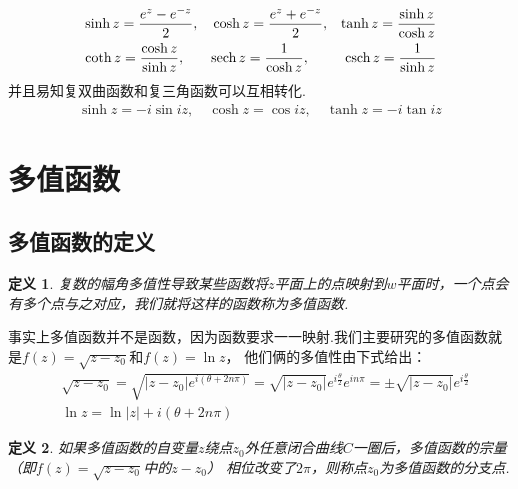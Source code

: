 \documentclass[12pt, a4paper]{ctexbook}
\newtheorem{definition}{定义}[chapter] %
\begin{document}
\begin{enumerate}
                        \begin{align*}
                            & \sinh{z} = \frac{e^z - e^{-z}}{2},& &\cosh{z} = \frac{e^z + e^{-z}}{2}, & \tanh{z} = \frac{\sinh{z}}{\cosh{z}}&\\
                            & \coth{z} = \frac{\cosh{z}}{\sinh{z}},& &\textnormal{sech}\,z = \frac{1}{\cosh{z}}, & \textnormal{csch}\,z = \frac{1}{\sinh{z}}&
                        \end{align*}
                        并且易知复双曲函数和复三角函数可以互相转化.
                        \begin{align*}
                            \sinh{z} = -i\sin{iz}, \quad \cosh{z} = \cos{iz}, \quad \tanh{z} = -i\tan{iz}
                        \end{align*}
                \end{enumerate}


        \section{多值函数}

            \subsection{多值函数的定义}
                \allowdisplaybreaks
                \begin{definition}
                    \label{def:multi_value_function}
                    复数的幅角多值性导致某些函数将$z$平面上的点映射到$w$平面时，一个点会有多个点与之对应，我们就将这样的函数称为多值函数.
                \end{definition}

                事实上多值函数并不是函数，因为函数要求一一映射.我们主要研究的多值函数就是$f(z) = \sqrt{z - z_0}$和$f(z) = \ln{z}$，
                他们俩的多值性由下式给出：
                \begin{align}
                    \label{eq:multi_value_function}
                    &\sqrt{z - z_0} = \sqrt{|z - z_0|e^{i(\theta + 2n\pi)}} = \sqrt{|z - z_0|}e^{i\frac{\theta}{2}}e^{in\pi} = \pm \sqrt{|z - z_0|}e^{i\frac{\theta}{2}}\\
                    &\ln{z} = \ln{|z|} + i(\theta + 2n\pi)
                \end{align}

                \begin{definition}
                    \label{def:branch_point}
                    如果多值函数的自变量$z$绕点$z_0$外任意闭合曲线$C$一圈后，多值函数的宗量（即$f(z) = \sqrt{z - z_0}$中的$z - z_0$）
                    相位改变了$2\pi$，则称点$z_0$为多值函数的分支点.
                \end{definition}
\end{document}
